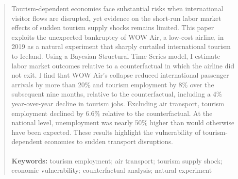 \begin{abstract}
Tourism-dependent economies face substantial risks when international visitor flows are disrupted, yet evidence on the short-run labor market effects of sudden tourism supply shocks remains limited. This paper exploits the unexpected bankruptcy of WOW Air, a low-cost airline, in 2019 as a natural experiment that sharply curtailed international tourism to Iceland. Using a Bayesian Structural Time Series model, I estimate labor market outcomes relative to a counterfactual in which the airline did not exit. I find that WOW Air’s collapse reduced international passenger arrivals by more than 20\% and tourism employment by 8\% over the subsequent nine months, relative to the counterfactual, including a 4\% year-over-year decline in tourism jobs. Excluding air transport, tourism employment declined by 6.6\% relative to the counterfactual. At the national level, unemployment was nearly 50\% higher than would otherwise have been expected. These results highlight the vulnerability of tourism-dependent economies to sudden transport disruptions.
\\ 
\\
\normalfont
\noindent\textbf{Keywords:}  tourism employment; air transport; tourism supply shock; economic vulnerability; counterfactual analysis;  natural experiment
\end{abstract}
